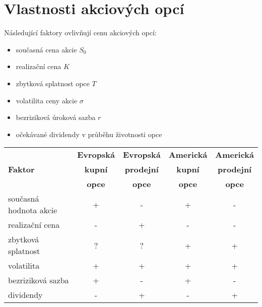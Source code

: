 \documentclass[a4paper]{book}
\begin{document}
\section{Vlastnosti akciových opcí}

Následující faktory ovlivňují cenu akciových opcí:
\begin{itemize}
\item současná cena akcie $S_0$
\item realizační cena $K$
\item zbytková splatnost opce $T$
\item volatilita ceny akcie $\sigma$
\item bezriziková úroková sazba $r$
\item očekávané dividendy v průběhu životnosti opce
\end{itemize}

\begin{center}
\begin{tabular}{l c c c c}
\textbf{} &
\textbf{Evropská} &
\textbf{Evropská} &
\textbf{Americká} &
\textbf{Americká} \\
\textbf{Faktor} &
\textbf{kupní} &
\textbf{prodejní} &
\textbf{kupní} &
\textbf{prodejní} \\
\textbf{} &
\textbf{opce} &
\textbf{opce} &
\textbf{opce} &
\textbf{opce} \\
\hline
současná hodnota akcie & + & - & + & - \\
realizační cena & - & + & - & - \\
zbytková splatnost & ? & ? & + & + \\
volatilita & + & + & + & + \\
bezriziková sazba & + & - & + & - \\
dividendy & - & + & - & + \\
\hline 
\end{tabular}
\end{center}
\end{document}
